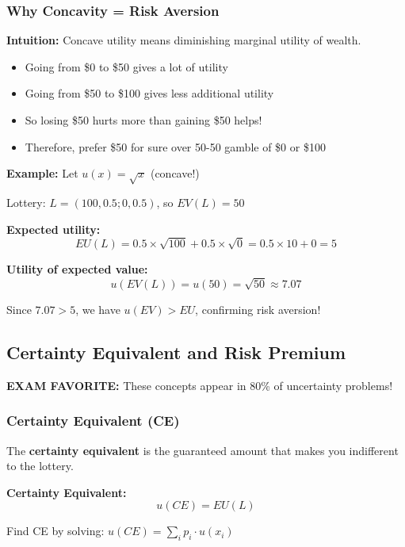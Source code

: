 \documentclass[10pt,letterpaper]{article}
\begin{document}
\subsubsection{Why Concavity = Risk Aversion}

\textbf{Intuition:} Concave utility means diminishing marginal utility of wealth.
\begin{itemize}
  \item Going from \$0 to \$50 gives a lot of utility
  \item Going from \$50 to \$100 gives less additional utility
  \item So losing \$50 hurts more than gaining \$50 helps!
  \item Therefore, prefer \$50 for sure over 50-50 gamble of \$0 or \$100
\end{itemize}

\begin{examplebox}
\textbf{Example:} Let $u(x) = \sqrt{x}$ (concave!)

Lottery: $L = (100, 0.5; 0, 0.5)$, so $EV(L) = 50$

\textbf{Expected utility:}
\[
EU(L) = 0.5 \times \sqrt{100} + 0.5 \times \sqrt{0} = 0.5 \times 10 + 0 = 5
\]

\textbf{Utility of expected value:}
\[
u(EV(L)) = u(50) = \sqrt{50} \approx 7.07
\]

Since $7.07 > 5$, we have $u(EV) > EU$, confirming risk aversion!
\end{examplebox}

\subsection{Certainty Equivalent and Risk Premium}

\begin{criticalbox}
\textbf{EXAM FAVORITE:} These concepts appear in 80\% of uncertainty problems!
\end{criticalbox}

\subsubsection{Certainty Equivalent (CE)}

The \textbf{certainty equivalent} is the guaranteed amount that makes you indifferent to the lottery.

\begin{formulabox}
\textbf{Certainty Equivalent:}
\[
\boxed{u(CE) = EU(L)}
\]

Find CE by solving: $u(CE) = \sum_i p_i \cdot u(x_i)$
\end{formulabox}
\end{document}
